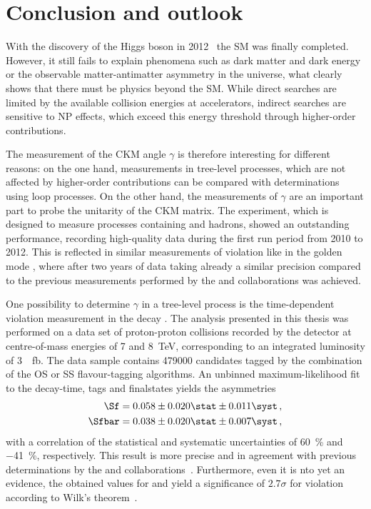 \chapter{Conclusion and outlook}
\label{chap:conclusion}

\linespread{1.08}\selectfont

With the discovery of the Higgs boson in \num{2012}~\cite{Chatrchyan:2012xdj, Aad:2012tfa} the \ac{SM} was finally completed.
However, it still fails to explain phenomena such as dark matter and dark energy or the observable matter-antimatter asymmetry in the universe, what clearly shows that there must be physics beyond the \ac{SM}.
While direct searches are limited by the available collision energies at accelerators, indirect searches are sensitive to \ac{NP} effects, which exceed this energy threshold through higher-order contributions.

The measurement of the CKM angle $\gamma$ is therefore interesting for different reasons: on the one hand, measurements in tree-level processes, which are not affected by higher-order contributions can be compared with determinations using loop processes.
On the other hand, the measurements of $\gamma$ are an important part to probe the unitarity of the CKM matrix.
The \lhcb experiment, which is designed to measure processes containing \bquark and \cquark hadrons, showed an outstanding performance, recording high-quality data during the first \lhc run period from \num{2010} to \num{2012}.
This is reflected in similar measurements of \CP violation like in the golden mode \BdToJPsiKS, where after two years of data taking already a similar precision compared to the previous measurements performed by the \belle and \babar collaborations was achieved.

One possibility to determine $\gamma$ in a tree-level process is the time-dependent \CP violation measurement in the decay \BdToDpi.
The analysis presented in this thesis was performed on a data set of proton-proton collisions recorded by the \lhcb detector at centre-of-mass energies of \num{7} and \SI{8}{\tera\electronvolt}, corresponding to an integrated luminosity of \SI{3}{\per\femto\barn}.
The data sample contains \num{479000} \BdToDpi candidates tagged by the combination of the OS or SS flavour-tagging algorithms.
An unbinned maximum-likelihood fit to the decay-time, tags and finalstates yields the \CP asymmetries
\begin{align}
\Sf&=0.058\pm0.020\stat\pm0.011\syst\,,\nonumber\\
\Sfbar&=0.038\pm0.020\stat\pm0.007\syst\,,\nonumber
\end{align}
with a correlation of the statistical and systematic uncertainties of \SI{60}{\percent} and \SI{-41}{\percent}, respectively.
This result is more precise and in agreement with previous determinations by the \belle and \babar collaborations~\cite{Ronga:2006hv,Aubert:2006tw}.
Furthermore, even it is nto yet an evidence, the obtained values for \Sf and \Sfbar yield a significance of $2.7\sigma$ for \mbox{\CP violation} according to Wilk's theorem~\cite{wilks1938}.

